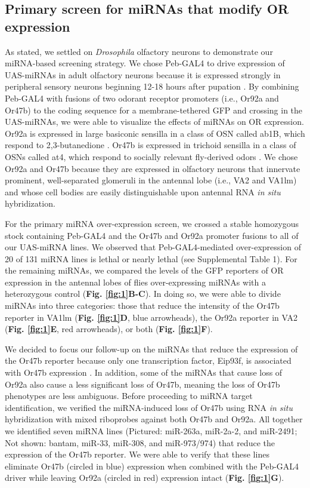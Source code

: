 \subsection*{Primary screen for miRNAs that modify OR expression}

As stated, we settled on \emph{Drosophila} olfactory neurons to demonstrate our miRNA-based screening strategy.
We chose Peb-GAL4 to drive expression of UAS-miRNAs in adult olfactory neurons because it is expressed strongly in peripheral sensory neurons beginning 12-18 hours after pupation \cite{dnik_Dickson_Luo_Komiyama_2007}.
By combining Peb-GAL4 with fusions of two odorant receptor promoters (i.e., Or92a and Or47b) to the coding sequence for a membrane-tethered GFP and crossing in the UAS-miRNAs, we were able to visualize the effects of miRNAs on OR expression.
Or92a is expressed in large basiconic sensilla in a class of OSN called ab1B, which respond to 2,3-butanedione \cite{de_Bruyne_Foster_Carlson_2001}.
Or47b is expressed in trichoid sensilla in a class of OSNs called at4, which respond to socially relevant fly-derived odors \cite{vanderGoesvanNaters:2007cq}.
We chose Or92a and Or47b because they are expressed in olfactory neurons that innervate prominent, well-separated glomeruli in the antennal lobe (i.e., VA2 and VA1lm) and whose cell bodies are easily distinguishable upon antennal RNA \emph{in situ} hybridization.

For the primary miRNA over-expression screen, we crossed a stable homozygous stock containing Peb-GAL4 and the Or47b and Or92a promoter fusions to all of our UAS-miRNA lines.
We observed that Peb-GAL4-mediated over-expression of 20 of 131 miRNA lines is lethal or nearly lethal (see Supplemental Table 1).
For the remaining miRNAs, we compared the levels of the GFP reporters of OR expression in the antennal lobes of flies over-expressing miRNAs with a heterozygous control (\textbf{Fig. \ref{fig:1}B-C}).
In doing so, we were able to divide miRNAs into three categories: those that reduce the intensity of the Or47b reporter in VA1lm (\textbf{Fig. \ref{fig:1}D}, blue arrowheads), the Or92a reporter in VA2 (\textbf{Fig. \ref{fig:1}E}, red arrowheads), or both (\textbf{Fig. \ref{fig:1}F}).

We decided to focus our follow-up on the miRNAs that reduce the expression of the Or47b reporter because only one transcription factor, Eip93f, is associated with Or47b expression \cite{Brochtrup_Hummel_Alenius_2012}.
In addition, some of the miRNAs that cause loss of Or92a also cause a less significant loss of Or47b, meaning the loss of Or47b phenotypes are less ambiguous.
Before proceeding to miRNA target identification, we verified the miRNA-induced loss of Or47b using RNA \emph{in situ} hybridization with mixed riboprobes against both Or47b and Or92a.
All together we identified seven miRNA lines (Pictured: miR-263a, miR-2a-2, and miR-2491; Not shown: bantam, miR-33, miR-308, and miR-973/974) that reduce the expression of the Or47b reporter.
We were able to verify that these lines eliminate Or47b (circled in blue) expression when combined with the Peb-GAL4 driver while leaving Or92a (circled in red) expression intact (\textbf{Fig. \ref{fig:1}G}).
